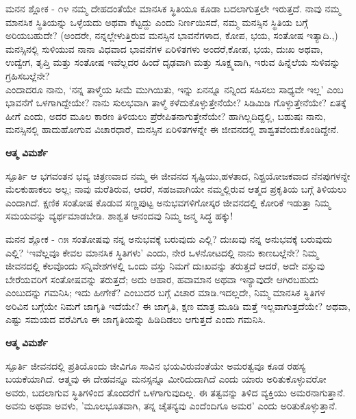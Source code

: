 \begin{mananam}{\mananamfont \large ಮನನ ಶ್ಲೋಕ - ೧೪}
\footnotesize \mananamtext ನಮ್ಮ ದೇಹದಂತೆಯೇ ಮಾನಸಿಕ ಸ್ಥಿತಿಯೂ ಕೂಡಾ ಬದಲಾಗುತ್ತಲೇ ಇರುತ್ತದೆ. ನಾವು ನಮ್ಮ ಮಾನಸಿಕ ಸ್ಥಿತಿಯನ್ನು ಒಳ್ಳೆಯದು ಅಥವಾ ಕೆಟ್ಟದ್ದು ಎಂದು ನಿರ್ಣಯಿಸದೆ, ನಮ್ಮ ಮನಸ್ಸಿನ ಸ್ಥಿತಿಯ ಬಗ್ಗೆ ಅರಿಯಬಹುದೇ? (ಅಂದರೇ, ನನ್ನಲ್ಲೇಳುತ್ತಿರುವ ಮನಸ್ಸಿನ ಭಾವನೆಗಳಾದ, ಕೋಪ,  ಭಯ, ಸಂತೋಷ ಇತ್ಯಾದಿ.,) ಮನಸ್ಸಿನಲ್ಲಿ ಸುಳಿಯುವ ನಾನಾ ವಿಧವಾದ ಭಾವನೆಗಳ ಏರಿಳಿತಗಳು ಅಂದರೆ,ಕೋಪ, ಭಯ, ದುಃಖ ಅಥವಾ, ಉದ್ವೇಗ, ತೃಪ್ತಿ ಮತ್ತು ಸಂತೋಷ ಇವೆಲ್ಲದರ ಹಿಂದೆ ದೃಢವಾಗಿ ಮತ್ತು ಸೂಕ್ಷ್ಮವಾಗಿ, ಇರುವ ಹಿನ್ನೆಲೆಯ ಸುಳಿವನ್ನು ಗ್ರಹಿಸಬಲ್ಲೆನೇ?\\
ಎಂದಾದರೂ ನಾನು, ‘ನನ್ನ ತಾಳ್ಮೆಯ ಸೀಮೆ ಮುಗಿಯಿತು, ಇನ್ನು ಏನನ್ನೂ ನನ್ನಿಂದ ಸಹಿಸಲು ಸಾಧ್ಯವೇ ಇಲ್ಲ’ ಎಂಬ ಭಾವನೆಗೆ ಒಳಗಾಗಿದ್ದೇಯೇ? ನಾನು ಸುಲಭವಾಗಿ ತಾಳ್ಮೆ ಕಳೆದುಕೊಳ್ಳುತ್ತೇನೆಯೇ? ಸಿಡಿಮಿಡಿ ಗೊಳ್ಳುತ್ತೇನೆಯೇ? ಏತಕ್ಕೆ ಹೀಗೆ ಎಂದು, ಅದರ ಮೂಲ ಕಾರಣ ತಿಳಿಯಲು ಪ್ರೆರೇಪಿತನಾಗುತ್ತೇನೆಯೇ? ಹಾಗಿಲ್ಲದಿದ್ದಲ್ಲಿ,  ಬಹುಷಃ ನಾನು,  ಮನಸ್ಸಿನಲ್ಲಿ ಹಾದುಹೋಗುವ ವಿಚಾರಧಾರೆ, ಮನಸ್ಸಿನ ಏರಿಳಿತಗಳನ್ನೇ ಈ ಜೀವನದಲ್ಲಿ ಶಾಶ್ವತವೆಂದುಕೊಂಡಿದ್ದೇನೆ. 
\end{mananam}
\WritingHand\enspace\textbf{ಆತ್ಮ ವಿಮರ್ಶೆ}
\begin{inspiration}{\mananamfont \large ಸ್ಪೂರ್ತಿ}
\footnotesize \mananamtext ಆ ಭಗವಂತನ ಭವ್ಯ ಚಿತ್ರಣವಾದ ನಮ್ಮ ಈ ಜೀವನದ ಸೃಷ್ಟಿಯು,ಹಳತಾದ, ನಿಶ್ಪ್ರಯೋಜಕವಾದ ನೆನಪುಗಳನ್ನೇ ಮೆಲಕುಹಾಕಲು ಅಲ್ಲ; ನಾವು ಮರೆತಿರುವ, ಆದರೆ, ಸಹಜವಾಗಿಯೇ ನಮ್ಮಲ್ಲಿರುವ ಆತ್ಮದ ಪ್ರಕೃತಿಯ ಬಗ್ಗೆ ತಿಳಿಯಲು ಎಂದಾಗಿದೆ. ಕ್ಷಣಿಕ ಸಂತೋಷ ಕೊಡುವ ಸಣ್ಣಪುಟ್ಟ ಅನುಭವಗಳಿಗೋಸ್ಕರ ಜೀವನದಲ್ಲಿ ಕೋರಿಕೆ ಇಡುತ್ತಾ ನಿಮ್ಮ ಸಮಯವನ್ನು ವ್ಯರ್ಥಮಾಡಬೇಡಿ.  ಶಾಶ್ವತ ಆನಂದವು ನಿಮ್ಮ ಜನ್ಮ ಸಿದ್ಧ ಹಕ್ಕು!
\end{inspiration}
\newpage

\begin{mananam}{\mananamfont \large ಮನನ ಶ್ಲೋಕ - ೧೫}
\footnotesize \mananamtext ಸಂತೋಷವು ನನ್ನ ಅನುಭವಕ್ಕೆ ಬರುವುದು ಎಲ್ಲಿ?  ದುಃಖವು ನನ್ನ ಅನುಭವಕ್ಕೆ ಬರುವುದು ಎಲ್ಲಿ? ‘ಇವೆಲ್ಲವೂ ಕೇವಲ ಮಾನಸಿಕ ಸ್ಥಿತಿಗಳು’ ಎಂದು, ನೇರ ಒಳನೋಟದಲ್ಲಿ ನಾನು ಕಾಣಬಲ್ಲೆನೇ? ನಿಮ್ಮ ಜೀವನದಲ್ಲಿ ಕೆಲವೊಂದು ಸನ್ನಿವೇಶಗಳಲ್ಲಿ ಒಂದು ವಸ್ತು ನಿಮಗೆ ದುಃಖವನ್ನು ತರುತ್ತದೆ ಆದರೆ, ಅದೇ ವಸ್ತುವು ಬೇರೆಯವರಿಗೆ ಸಂತೋಷವನ್ನು ತರುತ್ತದೆ; ಅದು ಆಹಾರ, ಹವಾಮಾನ ಅಥವಾ ಇನ್ಯಾವುದೇ ಆಗಿರಬಹುದು ಎಂಬುದನ್ನು ಗಮನಿಸಿ; ಇದು ಹೀಗೇಕೆ? ಎಂಬುದರ ಬಗ್ಗೆ ವಿಚಾರ ಮಾಡಿ.ಇದಲ್ಲದೇ, ನಿಮ್ಮ ಮಾನಸಿಕ ಸ್ಥಿತಿಗಳ ಅರಿವಿನ ಬಗ್ಗೆಯೇ ನಿಮಗೆ ಜಾಗೃತಿ ಇದೆಯೇ?  ಈ ಜಾಗೃತಿ, ಕ್ಷಣ ಮಾತ್ರ ಮೂಡಿ ಮತ್ತೆ ಇಲ್ಲವಾಗುತ್ತದೆಯೇ? ಅಥವಾ, ಎಷ್ಟು ಸಮಯದ ವರೆವಿಗೂ ಈ ಜಾಗೃತಿಯನ್ನು ಹಿಡಿದಿಡಲು ಆಗುತ್ತದೆ ಎಂದು ಗಮನಿಸಿ.
\end{mananam}
\WritingHand\enspace\textbf{ಆತ್ಮ ವಿಮರ್ಶೆ}
\begin{inspiration}{\mananamfont \large ಸ್ಪೂರ್ತಿ}
\footnotesize \mananamtext ಜೀವನದಲ್ಲಿ ಪ್ರತಿಯೊಂದು ಜೀವಿಗೂ ಸಾವಿನ ಭಯವಿರುವಂತೆಯೇ ಅಮರತ್ವವೂ ಕೂಡ ರಹಸ್ಯ ಬಯಕೆಯಾಗಿದೆ. ಆತ್ಮವು ಈ ದೇಹವನ್ನೂ ಮನಸ್ಸನ್ನೂ ಮೀರಿದುದಾಗಿದೆ ಎಂದು ಯಾರು ಅರಿತುಕೊಳ್ಳುವರೋ ಅವರು, ಬದಲಾಗುವ ಸ್ಥಿತಿಗಳಿಂದ ತೊಂದರೆಗೆ ಒಳಗಾಗುವುದಿಲ್ಲ. ಈ ತತ್ವವನ್ನು ತಿಳಿದ ವ್ಯಕ್ತಿಯು ಅಮರನಾಗುತ್ತಾನೆ. ಅವನು ಅಥವಾ ಅವಳು, 'ಮೂಲಭೂತವಾಗಿ, ತನ್ನ ಚೈತನ್ಯವು ಎಂದೆಂದಿಗೂ ಅಮರ' ಎಂದು ಅರಿತುಕೊಳ್ಳುತ್ತಾನೆ.
\end{inspiration}

